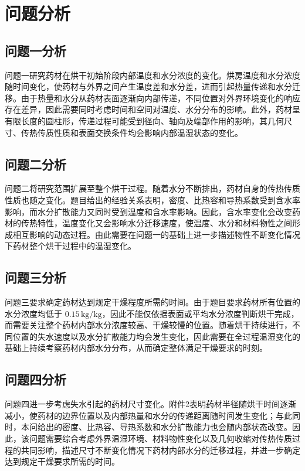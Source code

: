 \documentclass[withoutpreface]{cumcmthesis}
\begin{document}
\section{问题分析}
\subsection{问题一分析}
问题一研究药材在烘干初始阶段内部温度和水分浓度的变化。烘房温度和水分浓度随时间变化，使药材与外界之间产生温度差和水分差，进而引起热量传递和水分迁移。由于热量和水分从药材表面逐渐向内部传递，不同位置对外界环境变化的响应存在差异，因此需要同时考虑时间和空间对温度、水分分布的影响。此外，药材呈有限长度的圆柱形，传递过程可能受到径向、轴向及端部作用的影响，其几何尺寸、传热传质性质和表面交换条件均会影响内部温湿状态的变化。
\subsection{问题二分析}
问题二将研究范围扩展至整个烘干过程。随着水分不断排出，药材自身的传热传质性质也随之变化。题目给出的经验关系表明，密度、比热容和导热系数受到含水率影响，而水分扩散能力又同时受到温度和含水率影响。因此，含水率变化会改变药材的传热特性，温度变化又会影响水分迁移速度，使温度、水分和材料物性之间形成相互影响的动态过程。由此需要在问题一的基础上进一步描述物性不断变化情况下药材整个烘干过程中的温湿变化。
\subsection{问题三分析}
问题三要求确定药材达到规定干燥程度所需的时间。由于题目要求药材所有位置的水分浓度均低于 \(0.15\,\mathrm{kg/kg}\)，因此不能仅依据表面或平均水分浓度判断烘干完成，而需要关注整个药材内部水分浓度较高、干燥较慢的位置。随着烘干持续进行，不同位置的失水速度以及水分扩散能力均会发生变化，因此需要在全过程温湿变化的基础上持续考察药材内部水分分布，从而确定整体满足干燥要求的时刻。
\subsection{问题四分析}
问题四进一步考虑失水引起的药材尺寸变化。附件2表明药材半径随烘干时间逐渐减小，使药材的边界位置以及内部热量和水分的传递距离随时间发生变化；与此同时，本问给出的密度、比热容、导热系数和水分扩散能力也会随内部状态改变。因此，该问题需要综合考虑外界温湿环境、材料物性变化以及几何收缩对传热传质过程的共同影响，描述尺寸不断变化情况下药材内部水分的迁移过程，并进一步确定达到规定干燥要求所需的时间。
\end{document}
